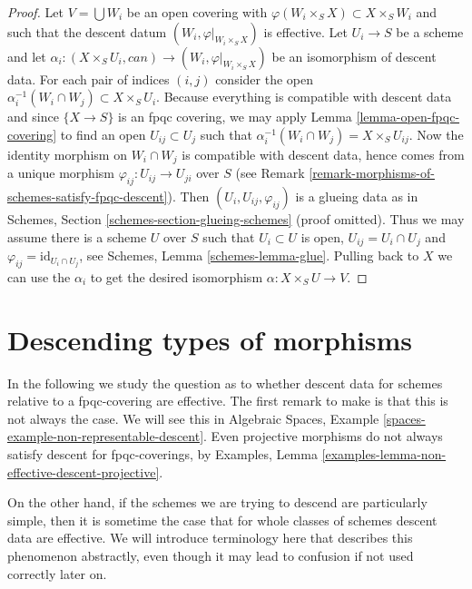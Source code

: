 \begin{proof}
Let $V = \bigcup W_i$ be an open covering with
$\varphi(W_i \times_S X) \subset X \times_S W_i$
and such that the descent datum $(W_i, \varphi|_{W_i \times_S X})$
is effective. Let $U_i \to S$ be a scheme and let
$\alpha_i : (X \times_S U_i, can) \to (W_i, \varphi|_{W_i \times_S X})$
be an isomorphism of descent data. For each pair of indices
$(i, j)$ consider the open
$\alpha_i^{-1}(W_i \cap W_j) \subset X \times_S U_i$.
Because everything is compatible with descent data
and since $\{X \to S\}$ is an fpqc covering, we
may apply Lemma \ref{lemma-open-fpqc-covering}
to find an open $U_{ij} \subset U_j$ such that
$\alpha_i^{-1}(W_i \cap W_j) = X \times_S U_{ij}$.
Now the identity morphism on $W_i \cap W_j$ is
compatible with descent data, hence comes from a
unique morphism $\varphi_{ij} : U_{ij} \to U_{ji}$ over $S$
(see Remark \ref{remark-morphisms-of-schemes-satisfy-fpqc-descent}).
Then $(U_i, U_{ij}, \varphi_{ij})$ is a glueing
data as in Schemes, Section \ref{schemes-section-glueing-schemes}
(proof omitted). Thus we may assume there is a scheme $U$ over $S$
such that $U_i \subset U$ is open, $U_{ij} = U_i \cap U_j$ and
$\varphi_{ij} = \text{id}_{U_i \cap U_j}$, see
Schemes, Lemma \ref{schemes-lemma-glue}.
Pulling back to $X$ we can use the $\alpha_i$ to
get the desired isomorphism $\alpha : X \times_S U \to V$.
\end{proof}







\section{Descending types of morphisms}
\label{section-descending-types-morphisms}

\noindent
In the following we study the question as to whether
descent data for schemes relative to a fpqc-covering
are effective. The first remark to make is that this
is not always the case. We will see this in Algebraic
Spaces, Example \ref{spaces-example-non-representable-descent}.
Even projective morphisms do not always satisfy descent
for fpqc-coverings, by Examples,
Lemma \ref{examples-lemma-non-effective-descent-projective}.

\medskip\noindent
On the other hand, if the schemes we are trying to
descend are particularly simple, then it is sometime the
case that for whole classes of schemes descent data
are effective. We will introduce terminology here that
describes this phenomenon abstractly, even though it
may lead to confusion if not used correctly later on.

